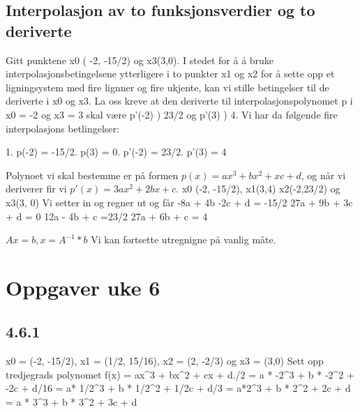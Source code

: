 \documentclass[a4paper,norsk]{article}
\begin{document}
\subsection{Interpolasjon av to funksjonsverdier og to deriverte}
Gitt punktene x0 ( -2, -15/2) og x3(3,0). I stedet for å å bruke interpolasjonsbetingelsene ytterligere i to punkter x1 og x2 
for å sette opp et ligningsystem med fire lignner og fire ukjente, kan vi stille betingelser til de deriverte i x0 og x3.
La oss kreve at den deriverte til interpolasjonspolynomet p i x0 = -2 og x3 = 3 skal være p'(-2) ) 23/2 og p'(3) ) 4.
Vi har da følgende fire interpolasjons betlingelser: \newline

1. p(-2) = -15/2. p(3) = 0. p'(-2) = 23/2. p'(3) = 4\newline

Polynoet vi skal bestemme er på formen \(p(x) = ax^3 + bx^2 + xc + d\), og når vi
deriverer fir vi \(p'(x) = 3ax^2 + 2bx + c\). x0 (-2, -15/2), x1(3,4) x2(-2,23/2) og x3(3, 0) Vi setter in og regner ut og får\newline
-8a + 4b -2c + d = -15/2\newline
27a + 9b + 3c + d = 0\newline
12a - 4b + c =23/2\newline
27a + 6b + c = 4\newline

\(Ax=b, x = A^ {-1} * b\) Vi kan fortsette utregnigne  på vanlig måte.

\section{Oppgaver uke 6}

\subsection{4.6.1}
x0 = (-2, -15/2), x1 = (1/2, 15/16), x2 = (2, -2/3) og x3 = (3,0)
Sett opp tredjegrads polynomet\newline
f(x) = ax^3 + bx^2 + cx + d./2 = a * -2^3 + b * -2^2 + -2c + d/16 = a* 1/2^3 + b * 1/2^2 + 1/2c + d/3 = a*2^3 + b * 2^2 + 2c + d = a * 3^3 + b * 3^2 + 3c + d\newline
\end{document}
